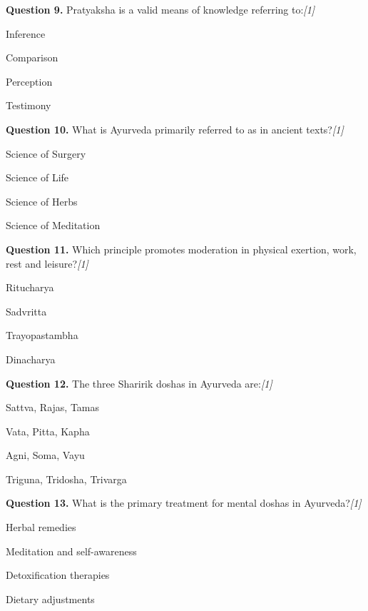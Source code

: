 \documentclass[11pt,a4paper]{article}
\newcommand{\pts}[1]{\hfill   \textit{[#1]}}
\begin{document}
\medskip


\noindent   \textbf{Question 9.} Pratyaksha is a valid means of knowledge referring to:\pts{1}

\begin{parts}
  \item Inference
  \item Comparison
  \item Perception
  \item Testimony
\end{parts}

\medskip


\noindent   \textbf{Question 10.} What is Ayurveda primarily referred to as in ancient texts?\pts{1}

\begin{parts}
  \item Science of Surgery
  \item Science of Life
  \item Science of Herbs
  \item Science of Meditation
\end{parts}

\medskip


\noindent   \textbf{Question 11.} Which principle promotes moderation in physical exertion, work, rest and leisure?\pts{1}

\begin{parts}
  \item Ritucharya
  \item Sadvritta
  \item Trayopastambha
  \item Dinacharya
\end{parts}

\medskip


\noindent   \textbf{Question 12.} The three Sharirik doshas in Ayurveda are:\pts{1}

\begin{parts}
  \item Sattva, Rajas, Tamas
  \item Vata, Pitta, Kapha
  \item Agni, Soma, Vayu
  \item Triguna, Tridosha, Trivarga
\end{parts}

\medskip


\noindent   \textbf{Question 13.} What is the primary treatment for mental doshas in Ayurveda?\pts{1}

\begin{parts}
  \item Herbal remedies
  \item Meditation and self-awareness
  \item Detoxification therapies
  \item Dietary adjustments
\end{parts}
\end{document}
